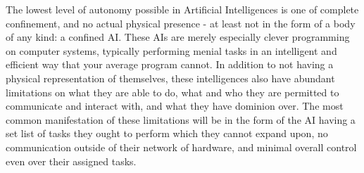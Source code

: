 The lowest level of autonomy possible in Artificial Intelligences is one of complete confinement, and no actual physical presence - at least not in the form of a body of any kind: a confined AI. These AIs are merely especially clever programming on computer systems, typically performing menial tasks in an intelligent and efficient way that your average program cannot. In addition to not having a physical representation of themselves, these intelligences also have abundant limitations on what they are able to do, what and who they are permitted to communicate and interact with, and what they have dominion over. The most common manifestation of these limitations will be in the form of the AI having a set list of tasks they ought to perform which they cannot expand upon, no communication outside of their network of hardware, and minimal overall control even over their assigned tasks.
